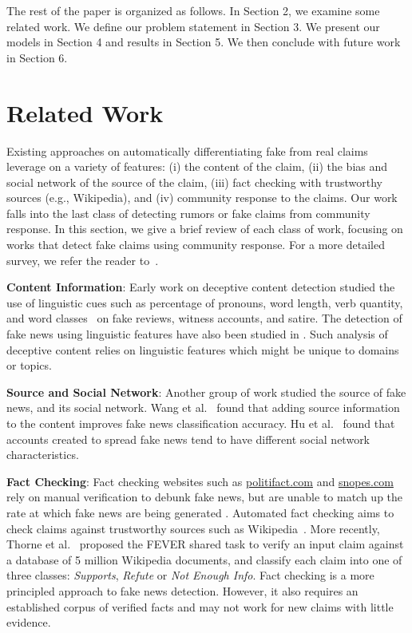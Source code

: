\documentclass[letterpaper]{article} %
\begin{document}
The rest of the paper is organized as follows. In Section 2, we examine some related work. We define our problem statement in Section 3. We present our models in Section 4 and results in Section 5. We then conclude with future work in Section 6.

\section{Related Work}

Existing approaches on automatically differentiating fake from real claims leverage on a variety of features: (i) the  content of the claim, (ii) the bias and social network of the source of the claim,  (iii) fact checking with trustworthy sources (e.g., Wikipedia), and (iv) community response to the claims. Our work falls into the last class of detecting rumors or fake claims from community response. In this section, we give a brief review of each class of work, focusing on works that detect fake claims using community response. For a more detailed survey, we refer the reader to~\cite{sharma2019}.

\textbf{Content Information}: Early work on deceptive content detection studied the use of linguistic cues such as percentage of pronouns, word length, verb quantity, and word classes~\cite{fuller09,mihalcea09,ott11,rubin16} on fake reviews, witness accounts, and satire. The detection of fake news using linguistic features have also been studied in \cite{obrien18,wang17liar}. Such analysis of deceptive content relies on linguistic features which might be unique to domains or topics.

\textbf{Source and Social Network}:
Another group of work studied the source of fake news, and its social network. Wang et al.~ found that adding source information to the content improves fake news classification accuracy. Hu et al.~ found that accounts created to spread fake news tend to have different social network characteristics.

\textbf{Fact Checking}:
Fact checking websites such as \url{politifact.com} and \url{snopes.com} rely on manual verification to debunk fake news, but are unable to match up the rate at which fake news are being generated \cite{poynter_2019}. Automated fact checking aims to check claims against trustworthy sources such as Wikipedia~\cite{giovanni15}.  More recently, Thorne et al.~ proposed the FEVER shared task to verify an input claim against a database of 5 million Wikipedia documents, and classify each claim into one of three classes: \textit{Supports}, \textit{Refute} or \textit{Not Enough Info}. Fact checking is a more principled approach to fake news detection. However, it also requires an established corpus of verified facts and may not work for new claims with little evidence.
\end{document}
